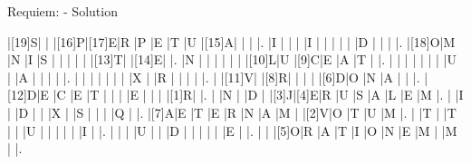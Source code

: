 \documentclass[12pt]{article}
\begin{document}
\newpage

\begin{center}
  \huge{Requiem: - Solution}
\end{center}
\vspace{1.5cm}
\PuzzleSolution
\begin{Puzzle}{15}{15}
  |[19]S|{}  |{}  |[16]P|[17]E|R   |P   |E   |T   |U   |[15]A|{}  |{}  |{}  |.
  |I   |{}  |{}  |{}  |I   |{}  |{}  |{}  |{}  |{}  |D   |{}  |{}  |{}  |.
  |[18]O|M   |N   |I   |S   |{}  |{}  |{}  |{}  |{}  |[13]T|{}  |[14]E|{}  |.
  |N   |{}  |{}  |{}  |{}  |{}  |{}  |[10]L|U   |[9]C|E   |A   |T   |{}  |.
  |{}  |{}  |{}  |{}  |{}  |{}  |{}  |U   |{}  |A   |{}  |{}  |{}  |{}  |.
  |{}  |{}  |{}  |{}  |{}  |{}  |{}  |X   |{}  |R   |{}  |{}  |{}  |{}  |.
  |{}  |[11]V|{}  |[8]R|{}  |{}  |{}  |{}  |[6]D|O   |N   |A   |{}  |{}  |.
  |[12]D|E   |C   |E   |T   |{}  |{}  |{}  |E   |{}  |{}  |{}  |[1]R|{}  |.
  |{}  |N   |{}  |D   |{}  |[3]J|[4]E|R   |U   |S   |A   |L   |E   |M   |.
  |{}  |I   |{}  |D   |{}  |{}  |X   |{}  |S   |{}  |{}  |{}  |Q   |{}  |.
  |[7]A|E   |T   |E   |R   |N   |A   |M   |{}  |[2]V|O   |T   |U   |M   |.
  |{}  |T   |{}  |T   |{}  |{}  |U   |{}  |{}  |{}  |{}  |{}  |I   |{}  |.
  |{}  |{}  |{}  |U   |{}  |{}  |D   |{}  |{}  |{}  |{}  |{}  |E   |{}  |.
  |{}  |{}  |[5]O|R   |A   |T   |I   |O   |N   |E   |M   |{}  |M   |{}  |.
\end{Puzzle}
\end{document}
